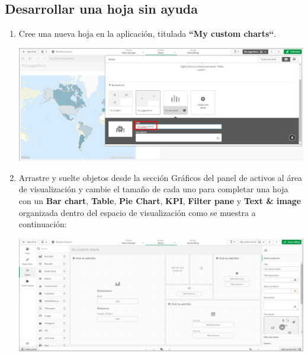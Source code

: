 \documentclass[12pt,letterpaper]{article}
\newcommand\tab[1][1cm]{\hspace*{#1}}
\begin{document}
    \subsection{Desarrollar una hoja sin ayuda}
    \begin{enumerate}[\tab 1.]
        \item Cree una nueva hoja en la aplicación, titulada \textbf{“My custom charts“}.
        \begin{center}
            \includegraphics[width=13cm]{./img/img28.png}
        \end{center}
        \item Arrastre y suelte objetos desde la sección Gráficos del panel de activos al área de visualización y cambie el tamaño de cada uno para completar una hoja con un \textbf{Bar chart}, \textbf{Table}, \textbf{Pie Chart}, \textbf{KPI}, \textbf{Filter pane} y \textbf{Text \& image} organizada dentro del espacio de visualización como se muestra a continuación:
        \begin{center}
            \includegraphics[width=13cm]{./img/img29.png}
        \end{center}
    \end{enumerate}
    
\end{document}
